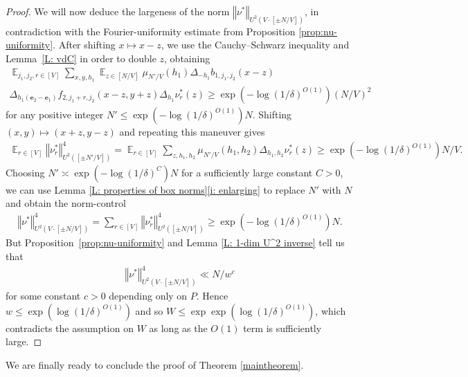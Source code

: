\documentclass[11pt]{amsart}
\theoremstyle{definition}
\DeclareMathOperator*{\E}{\mathbb{E}}
\newcommand{\be}{{\mathbf{e}}}
\newcommand{\norm}[1]{\left\Vert #1\right\Vert}
\begin{document}
\begin{proof}
We will now deduce the largeness of the norm $\norm{\nu^*}_{U^2(V\cdot[\pm N/V])}$, in contradiction with the Fourier-uniformity estimate from Proposition \ref{prop:nu-uniformity}.  After shifting $x\mapsto x-z$, we use the Cauchy--Schwarz inequality and Lemma~\ref{L: vdC} in order to double $z$, obtaining
\begin{multline*}
    \E_{j_1,j_2,r\in[V]}\sum_{x,y,h_1}\E_{z\in[N/V]} \mu_{N'/V}(h_1)\Delta_{-h_1}b_{1,j_1,j_2}(x-z)\\
    \Delta_{h_1(\be_2-\be_1)}f_{2,j_1+r,j_2}(x-z,y+z)\Delta_{h_1} \nu^*_r(z)\geq \exp(-\log(1/\delta)^{O(1)})(N/V)^2
\end{multline*}
for any positive integer $ N'\leq \exp(-\log(1/\delta)^{O(1)}) N$. Shifting $(x,y)\mapsto (x+z, y-z)$ and repeating this maneuver gives
\begin{align*}
    \E_{r\in[V]}\norm{\nu^*_r}_{U^2([\pm N'/V])}^4 = \E_{r\in[V]}\sum_{z,h_1,h_2}\mu_{N'/V}(h_1,h_2)\Delta_{h_1,h_2}\nu^*_r(z)\geq \exp(-\log(1/\delta)^{O(1)})N/V.
\end{align*}
Choosing $N'\asymp \exp(-\log(1/\delta)^{C}) N$ for a sufficiently large constant $C>0$, we can 
use Lemma \ref{L: properties of box norms}\eqref{i: enlarging} to replace $N'$ with $N$ and obtain the norm-control
\begin{align*}
    \norm{\nu^*}_{U^2(V\cdot[\pm N/V])}^4 = \sum_{r\in[V]}\norm{\nu^*_r}_{U^2([\pm N/V])}^4 \geq \exp(-\log(1/\delta)^{O(1)}) N.
\end{align*}
But Proposition~\ref{prop:nu-uniformity} and Lemma \ref{L: 1-dim U^2 inverse} tell us that
\begin{align*}
    \norm{\nu^*}_{U^2(V\cdot[\pm N/V])}^4 \ll N/w^{c}
\end{align*}
for some constant $c>0$ depending only on $P$. Hence $w \leq \exp(\log(1/\delta)^{O(1)})$ and so $W\leq \exp\exp(\log(1/\delta)^{O(1)})$,
which contradicts the assumption on $W$ as long as the $O(1)$ term is sufficiently large.
\end{proof}
We are finally ready to conclude the proof of Theorem \ref{maintheorem}.
\end{document}
